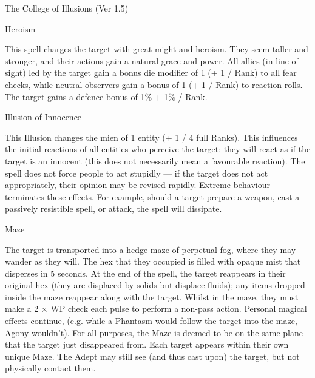 \begin{Chapter}{The College of Illusions (Ver 1.5)}
\begin{spell}[S-8]{Heroism}

\begin{effects}
This spell charges the target with great might and heroism.  They seem
taller and stronger, and their actions gain a natural grace and power.
All allies (in line-of-sight) led by the target gain a bonus die
modifier of 1 (+ 1 / Rank) to all fear checks, while neutral observers
gain a bonus of 1 (+ 1 / Rank) to reaction rolls.  The target gains a
defence bonus of 1\% + 1\% / Rank.
\end{effects}
\end{spell}

\begin{spell}[S-9]{Illusion of Innocence}

\begin{effects}
This Illusion changes the mien of 1 entity (+ 1 / 4 full Ranks).  This
influences the initial reactions of all entities who perceive the
target: they will react as if the target is an innocent (this does not
necessarily mean a favourable reaction).  The spell does not force
people to act stupidly --- if the target does not act appropriately,
their opinion may be revised rapidly.  Extreme behaviour terminates
these effects.  For example, should a target prepare a weapon, cast a
passively resistible spell, or attack, the spell will dissipate.
\end{effects}
\end{spell}

\begin{spell}[S-10]{Maze}

\begin{effects}
The target is transported into a hedge-maze of perpetual fog, where
they may wander as they will.  The hex that they occupied is filled
with opaque mist that disperses in 5 seconds. At the end of the spell,
the target reappears in their original hex (they are displaced by
solids but displace fluids); any items dropped inside the maze
reappear along with the target.  Whilst in the maze, they must make a
2 × WP check each pulse to perform a non-pass action. Personal magical
effects continue, (e.g. while a Phantasm would follow the target into
the maze, Agony wouldn’t).  For all purposes, the Maze is deemed to be
on the same plane that the target just disappeared from.  Each target
appears within their own unique Maze. The Adept may still see (and
thus cast upon) the target, but not physically contact them.
\end{effects}
\end{spell}


\end{Chapter}
